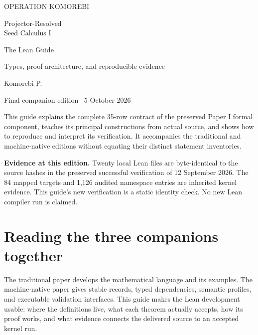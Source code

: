 \documentclass[11pt,a4paper]{article}
\begin{document}
\begin{titlepage}
\vspace*{18mm}
{\sffamily\large\color{teal}OPERATION KOMOREBI}\par
\vspace{14mm}
{\fontsize{32}{37}\selectfont Projector-Resolved\\Seed Calculus I}\par
\vspace{8mm}
{\fontsize{25}{29}\selectfont\sffamily\color{teal}The Lean Guide}\par
\vspace{6mm}
{\Large Types, proof architecture, and reproducible evidence}\par
\vspace{16mm}
{\large Komorebi P.}\par
{Final companion edition \textperiodcentered\ 5 October 2026}\par
\vfill
\begin{minipage}{.94\textwidth}
This guide explains the complete 35-row contract of the preserved Paper I formal component, teaches its principal constructions from actual source, and shows how to reproduce and interpret its verification. It accompanies the traditional and machine-native editions without equating their distinct statement inventories.
\medskip

\textbf{Evidence at this edition.} Twenty local Lean files are byte-identical to the source hashes in the preserved successful verification of 12 September 2026. The 84 mapped targets and 1,126 audited namespace entries are inherited kernel evidence. This guide's new verification is a static identity check. No new Lean compiler run is claimed.
\end{minipage}
\vspace{10mm}
\end{titlepage}
\tableofcontents
\clearpage

\section{Reading the three companions together}

The traditional paper develops the mathematical language and its examples. The machine-native paper gives stable records, typed dependencies, semantic profiles, and executable validation interfaces. This guide makes the Lean development usable: where the definitions live, what each theorem actually accepts, how its proof works, and what evidence connects the delivered source to an accepted kernel run.
\end{document}
